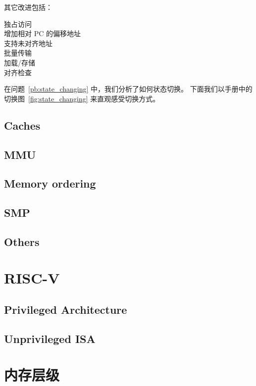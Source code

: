其它改进包括：
\begin{description}
  \item[独占访问]
  \item[增加相对 PC 的偏移地址]
  \item[支持未对齐地址]
  \item[批量传输]
  \item[加载/存储]
  \item[对齐检查]
\end{description}

在问题~\ref{pb:state_changing} 中，我们分析了如何状态切换。
下面我们以手册中的切换图~\ref{fig:state_changing} 来直观感受切换方式。


\subsection{Caches}

\subsection{MMU}

\subsection{Memory ordering}

\subsection{SMP}

\subsection{Others}

\section{RISC-V}

\subsection{Privileged Architecture}

\subsection{Unprivileged ISA}

\section{内存层级}
